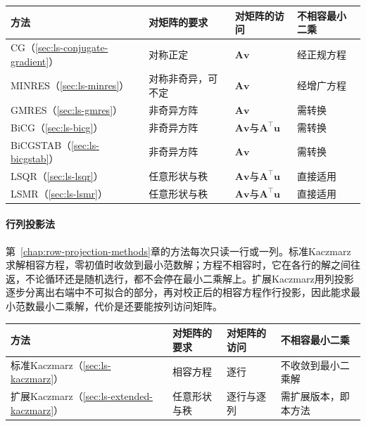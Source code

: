 \begin{BookInlineTable}
\small
\begin{tabular}{@{}>{\RaggedRight\arraybackslash}p{22mm}>{\RaggedRight\arraybackslash}p{}>{\RaggedRight\arraybackslash}p{}>{\RaggedRight\arraybackslash}p{}@{}}
\toprule
方法 & 对矩阵的要求 & 对矩阵的访问 & 不相容最小二乘\\
\midrule
CG（\ref{sec:ls-conjugate-gradient}） & 对称正定 & $\bm A\bm v$ & 经正规方程\\
MINRES（\ref{sec:ls-minres}） & 对称非奇异，可不定 & $\bm A\bm v$ & 经增广方程\\
GMRES（\ref{sec:ls-gmres}） & 非奇异方阵 & $\bm A\bm v$ & 需转换\\
BiCG（\ref{sec:ls-bicg}） & 非奇异方阵 & $\bm A\bm v$与$\bm A^\top\bm u$ & 需转换\\
BiCGSTAB（\ref{sec:ls-bicgstab}） & 非奇异方阵 & $\bm A\bm v$ & 需转换\\
LSQR（\ref{sec:ls-lsqr}） & 任意形状与秩 & $\bm A\bm v$与$\bm A^\top\bm u$ & 直接适用\\
LSMR（\ref{sec:ls-lsmr}） & 任意形状与秩 & $\bm A\bm v$与$\bm A^\top\bm u$ & 直接适用\\
\bottomrule
\end{tabular}
\caption{Krylov方法的矩阵条件与适用方式（基本版本）。括号内为对应小节。}
\label{tab:ls-krylov-method-applicability}
\end{BookInlineTable}

\paragraph{行列投影法}
第~\ref{chap:row-projection-methods}章的方法每次只读一行或一列。标准Kaczmarz求解相容方程，零初值时收敛到最小范数解；方程不相容时，它在各行的解之间往返，不论循环还是随机选行，都不会停在最小二乘解上。扩展Kaczmarz用列投影逐步分离出右端中不可拟合的部分，再对校正后的相容方程作行投影，因此能求最小范数最小二乘解，代价是还要能按列访问矩阵。

\begin{BookInlineTable}
\small
\begin{tabular}{@{}>{\RaggedRight\arraybackslash}p{22mm}>{\RaggedRight\arraybackslash}p{}>{\RaggedRight\arraybackslash}p{}>{\RaggedRight\arraybackslash}p{}@{}}
\toprule
方法 & 对矩阵的要求 & 对矩阵的访问 & 不相容最小二乘\\
\midrule
标准Kaczmarz（\ref{sec:ls-kaczmarz}） & 相容方程 & 逐行 & 不收敛到最小二乘解\\
扩展Kaczmarz（\ref{sec:ls-extended-kaczmarz}） & 任意形状与秩 & 逐行与逐列 & 需扩展版本，即本方法\\
\bottomrule
\end{tabular}
\caption{行列投影方法的矩阵条件与适用方式。括号内为对应小节。}
\label{tab:ls-row-method-applicability}
\end{BookInlineTable}

